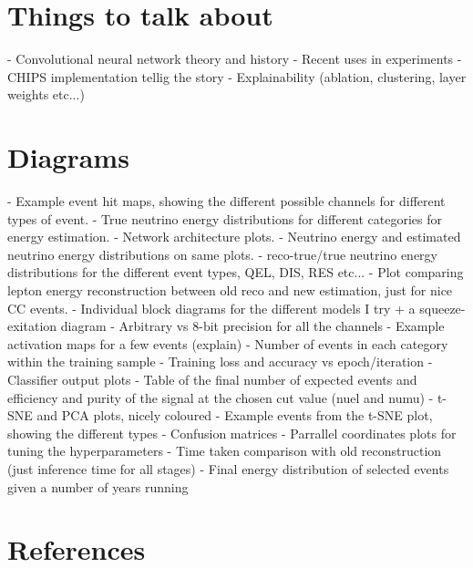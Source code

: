 \section{Things to talk about}
- Convolutional neural network theory and history
- Recent uses in experiments
- CHIPS implementation tellig the story
- Explainability (ablation, clustering, layer weights etc...)

\section{Diagrams}

- Example event hit maps, showing the different possible channels for different types of event.
- True neutrino energy distributions for different categories for energy estimation.
- Network architecture plots.
- Neutrino energy and estimated neutrino energy distributions on same plots.
- reco-true/true neutrino energy distributions for the different event types, QEL, DIS, RES etc...
- Plot comparing lepton energy reconstruction between old reco and new estimation, just for nice CC events.
- Individual block diagrams for the different models I try + a squeeze-exitation diagram
- Arbitrary vs 8-bit precision for all the channels
- Example activation maps for a few events (explain)
- Number of events in each category within the training sample
- Training loss and accuracy vs epoch/iteration
- Classifier output plots
- Table of the final number of expected events and efficiency and purity of the signal at the chosen cut value (nuel and numu)
- t-SNE and PCA plots, nicely coloured
- Example events from the t-SNE plot, showing the different types
- Confusion matrices
- Parrallel coordinates plots for tuning the hyperparameters
- Time taken comparison with old reconstruction (just inference time for all stages)
- Final energy distribution of selected events given a number of years running

\section{References}

